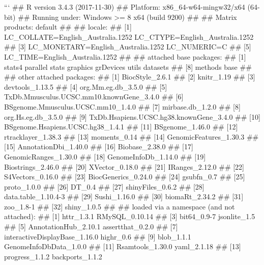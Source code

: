 ```
## R version 3.4.3 (2017-11-30)
## Platform: x86_64-w64-mingw32/x64 (64-bit)
## Running under: Windows >= 8 x64 (build 9200)
## 
## Matrix products: default
## 
## locale:
## [1] LC_COLLATE=English_Australia.1252  LC_CTYPE=English_Australia.1252   
## [3] LC_MONETARY=English_Australia.1252 LC_NUMERIC=C                      
## [5] LC_TIME=English_Australia.1252    
## 
## attached base packages:
## [1] stats4    parallel  stats     graphics  grDevices utils     datasets 
## [8] methods   base     
## 
## other attached packages:
##  [1] BiocStyle_2.6.1                         
##  [2] knitr_1.19                              
##  [3] devtools_1.13.5                         
##  [4] org.Mm.eg.db_3.5.0                      
##  [5] TxDb.Mmusculus.UCSC.mm10.knownGene_3.4.0
##  [6] BSgenome.Mmusculus.UCSC.mm10_1.4.0      
##  [7] mirbase.db_1.2.0                        
##  [8] org.Hs.eg.db_3.5.0                      
##  [9] TxDb.Hsapiens.UCSC.hg38.knownGene_3.4.0 
## [10] BSgenome.Hsapiens.UCSC.hg38_1.4.1       
## [11] BSgenome_1.46.0                         
## [12] rtracklayer_1.38.3                      
## [13] moments_0.14                            
## [14] GenomicFeatures_1.30.3                  
## [15] AnnotationDbi_1.40.0                    
## [16] Biobase_2.38.0                          
## [17] GenomicRanges_1.30.0                    
## [18] GenomeInfoDb_1.14.0                     
## [19] Biostrings_2.46.0                       
## [20] XVector_0.18.0                          
## [21] IRanges_2.12.0                          
## [22] S4Vectors_0.16.0                        
## [23] BiocGenerics_0.24.0                     
## [24] gsubfn_0.7                              
## [25] proto_1.0.0                             
## [26] DT_0.4                                  
## [27] shinyFiles_0.6.2                        
## [28] data.table_1.10.4-3                     
## [29] Sushi_1.16.0                            
## [30] biomaRt_2.34.2                          
## [31] zoo_1.8-1                               
## [32] shiny_1.0.5                             
## 
## loaded via a namespace (and not attached):
##  [1] httr_1.3.1                    RMySQL_0.10.14               
##  [3] bit64_0.9-7                   jsonlite_1.5                 
##  [5] AnnotationHub_2.10.1          assertthat_0.2.0             
##  [7] interactiveDisplayBase_1.16.0 highr_0.6                    
##  [9] blob_1.1.1                    GenomeInfoDbData_1.0.0       
## [11] Rsamtools_1.30.0              yaml_2.1.18                  
## [13] progress_1.1.2                backports_1.1.2              
